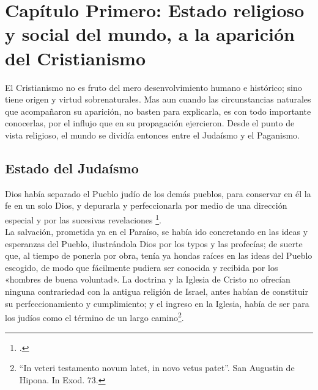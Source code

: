 \raggedbottom{} \documentclass[12pt, a4paper, openany]{book} %
\begin{document}
\chapter[Edo.\ relig.\ del mundo a la apar.\ del cristanismo]{Capítulo Primero: Estado religioso y social del mundo, a la aparición del Cristianismo}
El Cristianismo no es fruto del mero desenvolvimiento humano e histórico; sino tiene origen y virtud sobrenaturales. Mas aun cuando las circunstancias naturales que acompañaron su aparición, no basten para explicarla, es con todo importante conocerlas, por el influjo que en su propagación ejercieron. Desde el punto de vista religioso, el mundo se dividía entonces entre el Judaísmo y el Paganismo.
\section{Estado del Judaísmo}
Dios había separado el Pueblo judío de los demás pueblos, para conservar en él la fe en un solo Dios, y depurarla y perfeccionarla por medio de una dirección especial y por las sucesivas revelaciones \footcites{Flavius1856Opera}{Schurer1910Geschichte}. \\
La salvación, prometida ya en el Paraíso, se había ido concretando en las ideas y esperanzas del Pueblo, ilustrándola Dios por los typos y las profecías; de suerte que, al tiempo de ponerla por obra, tenía ya hondas raíces en las ideas del Pueblo escogido, de modo que fácilmente pudiera ser conocida y recibida por los «hombres de buena voluntad». La doctrina y la Iglesia de Cristo no ofrecían ninguna contrariedad con la antigua religión de Israel, antes habían de constituir su perfeccionamiento y cumplimiento; y el ingreso en la Iglesia, había de ser para los judíos como el término de un largo camino\footnote{``In veteri testamento novum latet, in novo vetus patet''. San Augustin de Hipona. In Exod. 73.}.
\end{document}
